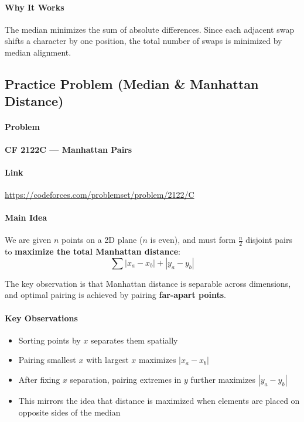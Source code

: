 \documentclass[11pt]{article}
\begin{document}
\paragraph{Why It Works}

The median minimizes the sum of absolute differences.
Since each adjacent swap shifts a character by one position,
the total number of swaps is minimized by median alignment.

\subsection{Practice Problem (Median \& Manhattan Distance)}

\paragraph{Problem}
\textbf{CF 2122C — Manhattan Pairs}

\paragraph{Link}
\url{https://codeforces.com/problemset/problem/2122/C}

\paragraph{Main Idea}

We are given $n$ points on a 2D plane ($n$ is even), and must form $\frac{n}{2}$
disjoint pairs to \textbf{maximize the total Manhattan distance}:
\[
\sum |x_a - x_b| + |y_a - y_b|
\]

The key observation is that Manhattan distance is separable across dimensions,
and optimal pairing is achieved by pairing \textbf{far-apart points}.

\paragraph{Key Observations}

\begin{itemize}
    \item Sorting points by $x$ separates them spatially
    \item Pairing smallest $x$ with largest $x$ maximizes $|x_a - x_b|$
    \item After fixing $x$ separation, pairing extremes in $y$ further
          maximizes $|y_a - y_b|$
    \item This mirrors the idea that distance is maximized when elements are
          placed on opposite sides of the median
\end{itemize}
\end{document}
